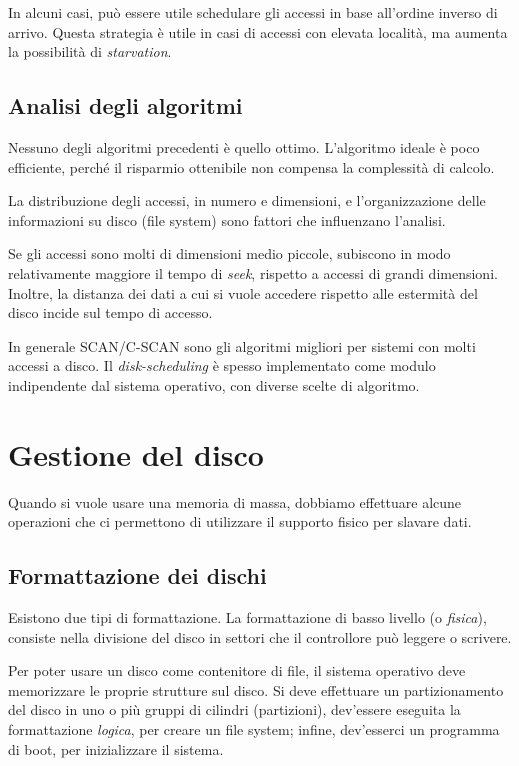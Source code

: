 \documentclass[a4paper,12pt, twoside]{report}
\begin{document}
In alcuni casi, pu\`o essere utile schedulare gli accessi in base all'ordine inverso di arrivo. Questa
strategia \`e utile in casi di accessi con elevata localit\`a, ma aumenta la possibilit\`a di \emph{starvation}.

\subsection{Analisi degli algoritmi}

Nessuno degli algoritmi precedenti \`e quello ottimo. L'algoritmo ideale \`e poco efficiente, perch\'e il
risparmio ottenibile non compensa la complessit\`a di calcolo. 

La distribuzione degli accessi, in numero e dimensioni, e l'organizzazione delle informazioni su disco (file system)
sono fattori che influenzano l'analisi. 

Se gli accessi sono molti di dimensioni medio piccole, subiscono in modo relativamente maggiore il 
tempo di \emph{seek}, rispetto a accessi di grandi dimensioni. Inoltre, la distanza dei dati a cui si
vuole accedere rispetto alle estermit\`a del disco incide sul tempo di accesso.

In generale SCAN/C-SCAN sono gli algoritmi migliori per sistemi con molti accessi a disco. Il 
\emph{disk-scheduling} \`e spesso implementato come modulo indipendente dal sistema operativo, con
diverse scelte di algoritmo. 


\section{Gestione del disco}

Quando si vuole usare una memoria di massa, dobbiamo effettuare alcune operazioni che ci permettono di 
utilizzare il supporto fisico per slavare dati.

\subsection{Formattazione dei dischi}

Esistono due tipi di formattazione. La formattazione di basso livello (o \emph{fisica}), consiste nella
divisione del disco in settori che il controllore pu\`o leggere o scrivere. 

Per poter usare un disco come contenitore di file, il sistema operativo deve memorizzare le proprie 
strutture sul disco. Si deve effettuare un partizionamento del disco in uno o pi\`u gruppi di cilindri (partizioni), 
dev'essere eseguita la formattazione \emph{logica}, per creare un file system; infine, dev'esserci un 
programma di boot, per inizializzare il sistema.
\end{document}
